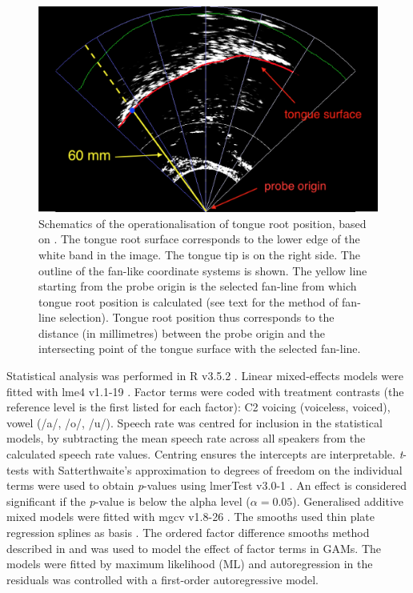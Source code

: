\documentclass[12pt,]{article}
\begin{document}
\begin{figure}
  \centering
  \includegraphics[width=5in]{./fig/trp.png}
  \caption{Schematics of the operationalisation of tongue root position, based on \citet{kirkham2017}. The tongue root surface corresponds to the lower edge of the white band in the image. The tongue tip is on the right side. The outline of the fan-like coordinate systems is shown. The yellow line starting from the probe origin is the selected fan-line from which tongue root position is calculated (see text for the method of fan-line selection). Tongue root position thus corresponds to the distance (in millimetres) between the probe origin and the intersecting point of the tongue surface with the selected fan-line.}
  \label{f:trp}
\end{figure}

Statistical analysis was performed in R v3.5.2 \citep{r-core-team2018}.
Linear mixed-effects models were fitted with lme4 v1.1-19
\citep{bates2015}. Factor terms were coded with treatment contrasts (the
reference level is the first listed for each factor): C2 voicing
(voiceless, voiced), vowel (/a/, /o/, /u/). Speech rate was centred for
inclusion in the statistical models, by subtracting the mean speech rate
across all speakers from the calculated speech rate values. Centring
ensures the intercepts are interpretable. \emph{t}-tests with
Satterthwaite's approximation to degrees of freedom on the individual
terms were used to obtain \emph{p}-values using lmerTest v3.0-1
\citep{kuznetsova2017, luke2017}. An effect is considered significant if
the \emph{p}-value is below the alpha level (\(\alpha = 0.05\)).
Generalised additive mixed models were fitted with mgcv v1.8-26
\citep{wood2011, wood2017}. The smooths used thin plate regression
splines as basis \citep{wood2003}. The ordered factor difference smooths
method described in \citet{soskuthy2017} and \citet{wieling2018} was
used to model the effect of factor terms in GAMs. The models were fitted
by maximum likelihood (ML) and autoregression in the residuals was
controlled with a first-order autoregressive model.
\end{document}
